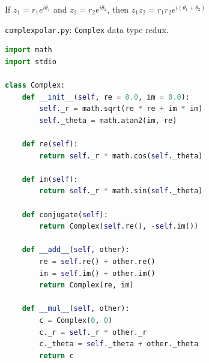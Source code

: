 \documentclass[8pt,a4paper,compress]{beamer}
\begin{document}
\begin{frame}[fragile]
\begin{minipage}{200pt}
If $z_1 = r_1e^{i\theta_1}$ and $z_2 = r_2e^{i\theta_2}$, then $z_1 z_2 = r_1 r_2 e^{i(\theta_1 + \theta_2)}$
\end{minipage}%
\hfill
\begin{minipage}{100pt}
\begin{center}
\end{center}
\end{minipage}%
\end{frame}

\begin{frame}[fragile]
\pause

\begin{framed}
\tiny \lstinline{complexpolar.py}: \lstinline{Complex} data type redux. 
\end{framed}

\begin{lstlisting}[language=Python]
import math
import stdio

class Complex:
    def __init__(self, re = 0.0, im = 0.0):
        self._r = math.sqrt(re * re + im * im)
        self._theta = math.atan2(im, re)

    def re(self):
        return self._r * math.cos(self._theta)

    def im(self):
        return self._r * math.sin(self._theta)

    def conjugate(self):
        return Complex(self.re(), -self.im())

    def __add__(self, other):
        re = self.re() + other.re()
        im = self.im() + other.im()
        return Complex(re, im)

    def __mul__(self, other):
        c = Complex(0, 0)
        c._r = self._r * other._r
        c._theta = self._theta + other._theta
        return c
\end{lstlisting}
\end{frame}
\end{document}
